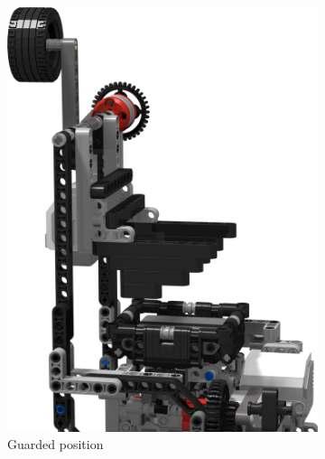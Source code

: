 \documentclass{report}
\begin{document}
	\begin{figure}[H]
		\centering
		\begin{subfigure}[b]{0.21688\textwidth}
			\includegraphics[width=\textwidth]{Resources/Images/rdrXMoveArmV1_1.png}
			\caption{Guarded position}
			\label{fig:rdrXMoveArmV1_1}
		\end{subfigure}
		\hspace{10mm}
		\begin{subfigure}[b]{0.21688\textwidth}

\end{subfigure}
\end{figure}
\end{document}
